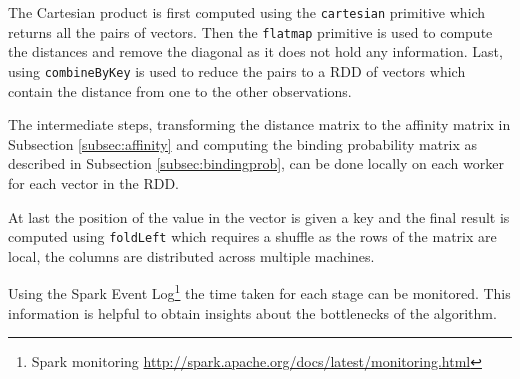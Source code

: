 The Cartesian product is first computed using the \texttt{cartesian} primitive which returns all the pairs of vectors. Then the \texttt{flatmap} primitive is used to compute the distances and remove the diagonal as it does not hold any information. Last, using \texttt{combineByKey} is used to reduce the pairs to a RDD of vectors which contain the distance from one to the other observations.

The intermediate steps, transforming the distance matrix to the affinity matrix in Subsection \ref{subsec:affinity} and computing the binding probability matrix as described in Subsection \ref{subsec:bindingprob}, can be done locally on each worker for each vector in the RDD.

At last the position of the value in the vector is given a key and the final result is computed using \texttt{foldLeft} which requires a shuffle as the rows of the matrix are local, the columns are distributed across multiple machines.

Using the Spark Event Log\footnote{Spark monitoring \url{http://spark.apache.org/docs/latest/monitoring.html}} the time taken for each stage can be monitored. This information is helpful to obtain insights about the bottlenecks of the algorithm.

